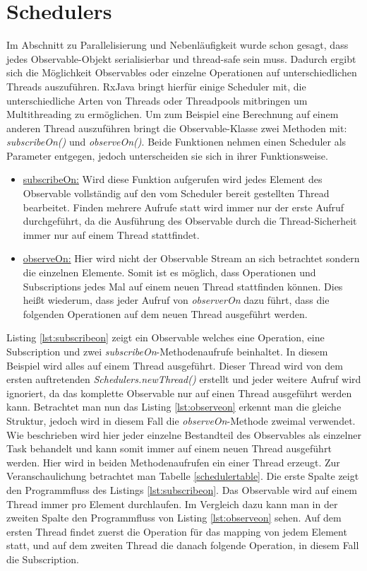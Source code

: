 \section{Schedulers}
Im Abschnitt zu Parallelisierung und Nebenläufigkeit wurde schon gesagt, dass jedes Observable-Objekt serialisierbar und thread-safe sein muss. Dadurch ergibt sich die Möglichkeit Observables oder einzelne Operationen auf unterschiedlichen Threads auszuführen. RxJava bringt hierfür einige Scheduler mit, die unterschiedliche Arten von Threads oder Threadpools mitbringen um Multithreading zu ermöglichen. Um zum Beispiel eine Berechnung auf einem anderen Thread auszuführen bringt die Observable-Klasse zwei Methoden mit: \textit{subscribeOn()} und \textit{observeOn()}. Beide Funktionen nehmen einen Scheduler als Parameter entgegen, jedoch unterscheiden sie sich in ihrer Funktionsweise. 
\begin{itemize}
\item \underline{subscribeOn:} Wird diese Funktion aufgerufen wird jedes Element des Observable vollständig auf den vom Scheduler bereit gestellten Thread bearbeitet. Finden mehrere Aufrufe statt wird immer nur der erste Aufruf durchgeführt, da die Ausführung des Observable durch die Thread-Sicherheit immer nur auf einem Thread stattfindet. 
\item \underline{observeOn:} Hier wird nicht der Observable Stream an sich betrachtet sondern die einzelnen Elemente. Somit ist es möglich, dass Operationen und Subscriptions jedes Mal auf einem neuen Thread stattfinden können. Dies heißt wiederum, dass jeder Aufruf von \textit{observerOn} dazu führt, dass die folgenden Operationen auf dem neuen Thread ausgeführt werden.
\end{itemize}

Listing \ref{lst:subscribeon} zeigt ein Observable welches eine Operation, eine Subscription und zwei \textit{subscribeOn}-Methodenaufrufe beinhaltet. In diesem Beispiel wird alles auf einem Thread ausgeführt. Dieser Thread wird von dem ersten auftretenden \textit{Schedulers.newThread()} erstellt und jeder weitere Aufruf wird ignoriert, da das komplette Observable nur auf einen Thread ausgeführt werden kann. Betrachtet man nun das Listing \ref{lst:observeon} erkennt man die gleiche Struktur, jedoch wird in diesem Fall die \textit{observeOn}-Methode zweimal verwendet. Wie beschrieben wird hier jeder einzelne Bestandteil des Observables als einzelner Task behandelt und kann somit immer auf einem neuen Thread ausgeführt werden. Hier wird in beiden Methodenaufrufen ein einer Thread erzeugt. Zur Veranschaulichung betrachtet man Tabelle \ref{schedulertable}. Die erste Spalte zeigt den Programmfluss des Listings \ref{lst:subscribeon}. Das Observable wird auf einem Thread immer pro Element durchlaufen. Im Vergleich dazu kann man in der zweiten Spalte den Programmfluss von Listing \ref{lst:observeon} sehen. Auf dem ersten Thread findet zuerst die Operation für das mapping von jedem Element statt, und auf dem zweiten Thread die danach folgende Operation, in diesem Fall die Subscription.
